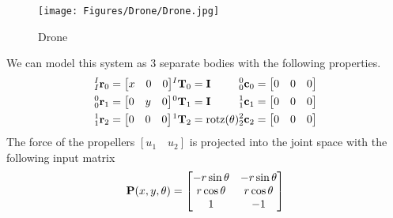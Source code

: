 \begin{figure}[H]
    \centering
    \texttt{[image: Figures/Drone/Drone.jpg]}
    \caption{Drone}
    \label{fig:drone}
\end{figure}
\noindent We can model this system as 3 separate bodies with the following properties.
\begin{align*}
    \begin{split}
        {^I_I \r _0} &= \begin{bmatrix} x & 0 & 0\end{bmatrix} \\
        {^0_0 \r _1} &= \begin{bmatrix} 0 & y & 0 \end{bmatrix} \\ 
        {^1_1 \r _2} &= \begin{bmatrix} 0& 0& 0 \end{bmatrix}\\
    \end{split}
    \begin{split}
        {^I \T_0} &= \EYE\\
        {^0 \T_1} &= \EYE\\
        {^1 \T_2} &= \text{rotz}(\theta)\\
    \end{split}
    \begin{split}
    \end{split}
    \begin{split}
        {^0_0 \com _0} &= \begin{bmatrix} 0& 0& 0 \end{bmatrix}\\
        {^1_1 \com _1} &= \begin{bmatrix} 0& 0& 0 \end{bmatrix}\\
        {^2_2 \com _2} &= \begin{bmatrix} 0& 0& 0 \end{bmatrix}\\
    \end{split}
\end{align*}
\noindent The force of the propellers $\left [ u_1 \quad u_2 \right ]$ is projected into the joint space with the following input matrix
\begin{align*}
    \P(x, y, \theta) = \begin{bmatrix}
    -r\sin{\theta} & -r\sin{\theta} \\ 
    r\cos{\theta} & r\cos{\theta} \\ 
    1 & -1 
    \end{bmatrix}
\end{align*}
